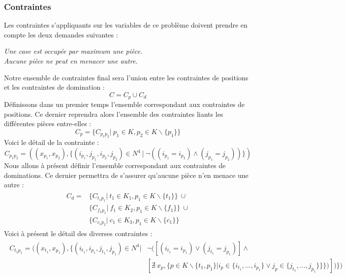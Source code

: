 \documentclass[a4paper]{article}
\begin{document}
\subsubsection{Contraintes}
Les contraintes s'appliquants sur les variables de ce problème doivent prendre en compte les deux demandes suivantes : 
\begin{center}
\textit{Une case est occupée par maximum une pièce.} \vspace{0.1cm} \\
\textit{Aucune pièce ne peut en menacer une autre.} 
\end{center}
Notre ensemble de contraintes final sera l'union entre les contraintes de positions et les contraintes de domination : 
\begin{equation*}
C = C_p \cup C_d
\end{equation*}
Définissons dans un premier temps l'ensemble correspondant aux contraintes de positions. Ce dernier reprendra alors l'ensemble des contraintes liants les différentes pièces entre-elles : 
\begin{equation*}
C_p = \{ C_{p_1p_2} | \  p_1 \in K, p_2 \in K \backslash \{ p_1 \} \}
\end{equation*}
Voici le détail de la contrainte : 
\begin{equation*}
C_{p_1p_2} = ((x_{p_1},x_{p_2}), \{ (i_{p_1},j_{p_1},i_{p_2},j_{p_2}) \in N^4 \ | \ \neg((i_{p_1} = i_{p_2}) \wedge (j_{p_1} = j_{p_2})) \})
\end{equation*}
Nous allons à présent définir l'ensemble correspondant aux contraintes de dominations. Ce dernier permettra de s'assurer qu'aucune pièce n'en menace une autre : 
\begin{align*}
\begin{split}
C_d ={}& \{ C_{t_1p_1} | \ t_1 \in K_1, p_1 \in K \backslash \{ t_1 \} \} \ \cup \\
	    & \{ C_{f_1p_1} | \ f_1 \in K_2, p_1 \in K \backslash \{ f_1 \} \} \ \cup \\
	    & \{ C_{c_1p_2} | \ c_1 \in K_3, p_1 \in K \backslash \{ c_1 \} \}
\end{split}
\end{align*}
Voici à présent le détail des diverses contraintes :  
\begin{align*}
\begin{split}
C_{t_1p_1} = ( (x_{t_1},x_{p_1}), \{ (i_{t_1},i_{p_1},j_{t_1},j_{p_1}) \in N^4 | & \neg( [ (i_{t_1} = i_{p_1}) \vee(j_{t_1} = j_{p_1}) ]\wedge \\
& [ \nexists \ x_p, \{ p \in K \backslash \{t_1,p_1\} | i_{p} \in \{ i_{t_1},...,i_{p_1} \} \vee j_p \in \{ j_{t_1},...,j_{p_1} \}\} \}) ] ) \} )
\end{split}
\end{align*}
\end{document}

